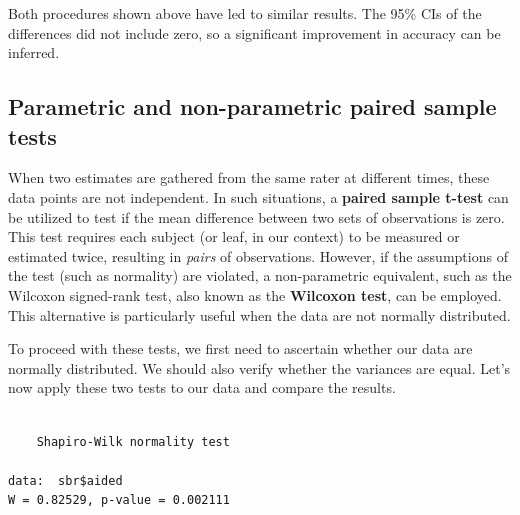 \documentclass[
  letterpaper,
  DIV=11,
  numbers=noendperiod]{scrreprt}
\newenvironment{Shaded}{\begin{snugshade}}{\end{snugshade}}
\newcommand{\CommentTok}[1]{\textcolor[rgb]{0.37,0.37,0.37}{#1}}
\newcommand{\FunctionTok}[1]{\textcolor[rgb]{0.28,0.35,0.67}{#1}}
\newcommand{\NormalTok}[1]{\textcolor[rgb]{0.00,0.23,0.31}{#1}}
\newcommand{\SpecialCharTok}[1]{\textcolor[rgb]{0.37,0.37,0.37}{#1}}
\begin{document}
Both procedures shown above have led to similar results. The 95\% CIs of
the differences did not include zero, so a significant improvement in
accuracy can be inferred.

\hypertarget{parametric-and-non-parametric-paired-sample-tests}{%
\subsection{Parametric and non-parametric paired sample
tests}\label{parametric-and-non-parametric-paired-sample-tests}}

When two estimates are gathered from the same rater at different times,
these data points are not independent. In such situations, a
\textbf{paired sample t-test} can be utilized to test if the mean
difference between two sets of observations is zero. This test requires
each subject (or leaf, in our context) to be measured or estimated
twice, resulting in \emph{pairs} of observations. However, if the
assumptions of the test (such as normality) are violated, a
non-parametric equivalent, such as the Wilcoxon signed-rank test, also
known as the \textbf{Wilcoxon test}, can be employed. This alternative
is particularly useful when the data are not normally distributed.

To proceed with these tests, we first need to ascertain whether our data
are normally distributed. We should also verify whether the variances
are equal. Let's now apply these two tests to our data and compare the
results.

\begin{Shaded}
\end{Shaded}

\begin{verbatim}

    Shapiro-Wilk normality test

data:  sbr$aided
W = 0.82529, p-value = 0.002111
\end{verbatim}

\begin{Shaded}
\end{Shaded}
\end{document}
